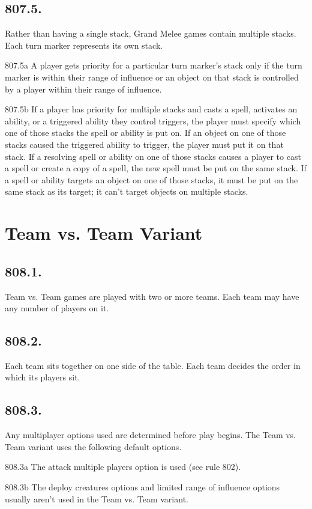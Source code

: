 \subsection*{807.5.}
Rather than having a single stack, Grand Melee games contain multiple stacks. Each turn marker represents its own stack.

807.5a A player gets priority for a particular turn marker’s stack only if the turn marker is within their range of influence or an object on that stack is controlled by a player within their range of influence.

807.5b If a player has priority for multiple stacks and casts a spell, activates an ability, or a triggered ability they control triggers, the player must specify which one of those stacks the spell or ability is put on. If an object on one of those stacks caused the triggered ability to trigger, the player must put it on that stack. If a resolving spell or ability on one of those stacks causes a player to cast a spell or create a copy of a spell, the new spell must be put on the same stack. If a spell or ability targets an object on one of those stacks, it must be put on the same stack as its target; it can’t target objects on multiple stacks.

\section{Team vs. Team Variant}
\subsection*{808.1.}
Team vs. Team games are played with two or more teams. Each team may have any number of players on it.

\subsection*{808.2.}
Each team sits together on one side of the table. Each team decides the order in which its players sit.

\subsection*{808.3.}
Any multiplayer options used are determined before play begins. The Team vs. Team variant uses the following default options.

808.3a The attack multiple players option is used (see rule 802).

808.3b The deploy creatures options and limited range of influence options usually aren’t used in the Team vs. Team variant.

